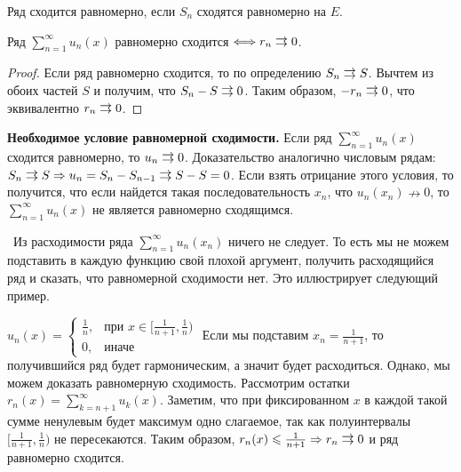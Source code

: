 \vspace*{5mm}

\begin{conj}
    Ряд сходится равномерно, если $S_n$ сходятся равномерно на $E$.
\end{conj}

\begin{theorem}
    Ряд $\sum\limits_{n = 1}^\infty u_n(x)$ равномерно сходится $\Longleftrightarrow r_n \doublerightarrow 0$. 
\end{theorem}
\begin{proof}
    Если ряд равномерно сходится, то по определению $S_n \doublerightarrow S$.
    Вычтем из обоих частей $S$ и получим, что $S_n - S \doublerightarrow 0$.
    Таким образом, $-r_n \doublerightarrow 0$, что эквивалентно $r_n \doublerightarrow 0$.
\end{proof}

\vspace*{5mm}

\textbf{Необходимое условие равномерной сходимости.} Если ряд $\sum\limits_{n = 1}^\infty u_n(x)$ сходится равномерно, то $u_n \doublerightarrow 0$.
Доказательство аналогично числовым рядам: $S_n \doublerightarrow S \Rightarrow u_n = S_n - S_{n-1} \doublerightarrow S - S = 0$.
Если взять отрицание этого условия, то получится, что если найдется такая последовательность $x_n$, что $u_n(x_n) \nrightarrow 0$, то $\sum\limits_{n = 1}^\infty u_n(x)$ не является равномерно сходящимся.
    
\notice \, Из расходимости ряда $\sum\limits_{n = 1}^\infty u_n(x_n)$ ничего не следует.
То есть мы не можем подставить в каждую функцию свой плохой аргумент, получить расходящийся ряд и сказать, что равномерной сходимости нет.
Это иллюстрирует следующий пример.

\begin{example}
    $u_n(x) = \begin{cases}
        \frac{1}{n}, & \text{при }x \in [\frac{1}{n + 1}, \frac{1}{n}) \\
        0, & \text{иначе}
    \end{cases}$
    \quad Если мы подставим $x_n = \frac{1}{n+1}$, то получившийся ряд будет гармоническим, а значит будет расходиться.
    Однако, мы можем доказать равномерную сходимость. 
    Рассмотрим остатки $r_n(x) = \sum\limits_{k = n + 1}^\infty u_k(x)$.
    Заметим, что при фиксированном $x$ в каждой такой сумме ненулевым будет максимум одно слагаемое, так как полуинтервалы $[\frac{1}{n+1}, \frac{1}{n})$ не пересекаются.
    Таким образом, $r_n(x) \leqslant \frac{1}{n+1} \Rightarrow r_n \doublerightarrow 0$ и ряд равномерно сходится.
\end{example}

